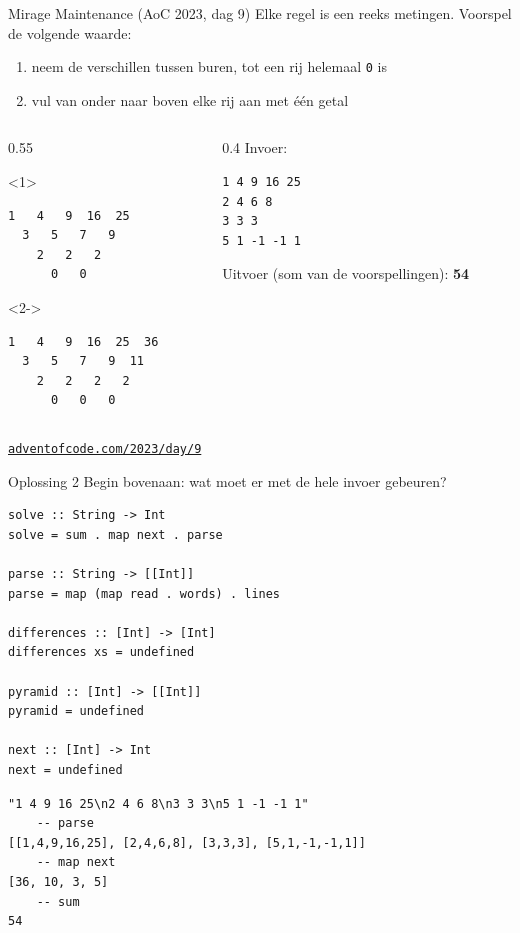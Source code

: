 \documentclass[aspectratio=169,11pt]{beamer}
\newcommand{\hs}{\lstinline[style=hsinline]}
\begin{document}
\begin{frame}[fragile]{Mirage Maintenance (AoC 2023, dag 9)}
  Elke regel is een reeks metingen. Voorspel de \alert{volgende} waarde:
  \begin{enumerate}
    \item neem de verschillen tussen buren, tot een rij helemaal \hs|0| is
    \item vul van onder naar boven elke rij aan met één getal
  \end{enumerate}
  \begin{columns}[T,onlytextwidth]
    \begin{column}{0.55\textwidth}
      \begin{onlyenv}<1>
\begin{lstlisting}
1   4   9  16  25
  3   5   7   9
    2   2   2
      0   0
\end{lstlisting}
      \end{onlyenv}
      \begin{onlyenv}<2->
\begin{lstlisting}
1   4   9  16  25  36
  3   5   7   9  11
    2   2   2   2
      0   0   0
\end{lstlisting}
      \end{onlyenv}
    \end{column}
    \begin{column}{0.4\textwidth}
      Invoer:
\begin{lstlisting}
1 4 9 16 25
2 4 6 8
3 3 3
5 1 -1 -1 1
\end{lstlisting}
      Uitvoer (som van de voorspellingen): \alert{\textbf{54}}
    \end{column}
  \end{columns}
  \medskip
  \href{https://adventofcode.com/2023/day/9}{\texttt{adventofcode.com/2023/day/9}}
\end{frame}

\begin{frame}[fragile]{Oplossing 2}
  Begin bovenaan: wat moet er met de hele invoer gebeuren?
\begin{lstlisting}
solve :: String -> Int
solve = sum . map next . parse

parse :: String -> [[Int]]
parse = map (map read . words) . lines

differences :: [Int] -> [Int]
differences xs = undefined

pyramid :: [Int] -> [[Int]]
pyramid = undefined

next :: [Int] -> Int
next = undefined
\end{lstlisting}
  \pause
\begin{lstlisting}
"1 4 9 16 25\n2 4 6 8\n3 3 3\n5 1 -1 -1 1"
    -- parse
[[1,4,9,16,25], [2,4,6,8], [3,3,3], [5,1,-1,-1,1]]
    -- map next
[36, 10, 3, 5]
    -- sum
54
\end{lstlisting}
\end{frame}
\end{document}
